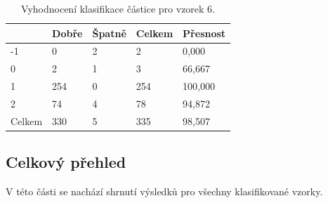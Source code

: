 \documentclass[11pt,twoside,a4paper,table]{book}
\begin{document}
\begin{table}[h]
\begin{center}
\begin{tabular}{lllll}
\rowcolor[HTML]{9B9B9B} 
\multicolumn{1}{|l|}{\cellcolor[HTML]{9B9B9B}Třída} & \multicolumn{1}{l|}{\cellcolor[HTML]{9B9B9B}Dobře} & \multicolumn{1}{l|}{\cellcolor[HTML]{9B9B9B}Špatně}  & \multicolumn{1}{l|}{\cellcolor[HTML]{9B9B9B}Celkem} & \multicolumn{1}{l|}{\cellcolor[HTML]{9B9B9B}Přesnost} \\ \hline
\multicolumn{1}{|l|}{-1}                            & \multicolumn{1}{l|}{0}                             & \multicolumn{1}{l|}{2}                               & \multicolumn{1}{l|}{2}                              & \multicolumn{1}{l|}{0,000}                            \\ \hline
\multicolumn{1}{|l|}{0}                             & \multicolumn{1}{l|}{2}                             & \multicolumn{1}{l|}{1}                               & \multicolumn{1}{l|}{3}                              & \multicolumn{1}{l|}{66,667}                           \\ \hline
\multicolumn{1}{|l|}{1}                             & \multicolumn{1}{l|}{254}                           & \multicolumn{1}{l|}{0}                               & \multicolumn{1}{l|}{254}                            & \multicolumn{1}{l|}{100,000}                          \\ \hline
\multicolumn{1}{|l|}{2}                             & \multicolumn{1}{l|}{74}                            & \multicolumn{1}{l|}{4}                               & \multicolumn{1}{l|}{78}                             & \multicolumn{1}{l|}{94,872}                           \\ \hline
\multicolumn{1}{|l|}{Celkem}                        & \multicolumn{1}{l|}{330}                           & \multicolumn{1}{l|}{5}                               & \multicolumn{1}{l|}{335}                            & \multicolumn{1}{l|}{98,507}                           \\ \hline
\end{tabular}
\end{center}
\caption{Vyhodnocení klasifikace částice pro vzorek 6.}
\label{tab:classresult7}
\end{table}

\newpage
\FloatBarrier
\subsection{Celkový přehled}
V této části se nachází shrnutí výsledků pro všechny klasifikované vzorky.
\end{document}
